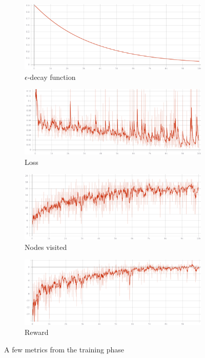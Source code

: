 \documentclass[a4paper]{article}
\begin{document}
\begin{figure}[ht] 
  \begin{subfigure}[b]{0.5\linewidth}
    \centering
    \includegraphics[width=0.75\linewidth]{figures/eps.png} 
    \caption{$\epsilon$-decay function} 
    \label{fig7:a} 
    \vspace{4ex}
  \end{subfigure}%
  \begin{subfigure}[b]{0.5\linewidth}
    \centering
    \includegraphics[width=0.75\linewidth]{figures/loss.png} 
    \caption{Loss} 
    \label{fig7:b} 
    \vspace{4ex}
  \end{subfigure} 
  \begin{subfigure}[b]{0.5\linewidth}
    \centering
    \includegraphics[width=0.75\linewidth]{figures/nodes.png} 
    \caption{Nodes visited} 
    \label{fig7:c} 
  \end{subfigure}%
  \begin{subfigure}[b]{0.5\linewidth}
    \centering
    \includegraphics[width=0.75\linewidth]{figures/reward.png} 
    \caption{Reward} 
    \label{fig7:d} 
  \end{subfigure} 
  \caption{A few metrics from the training phase}
  \label{fig7} 
 \label{fig:train}
\end{figure}
\end{document}
